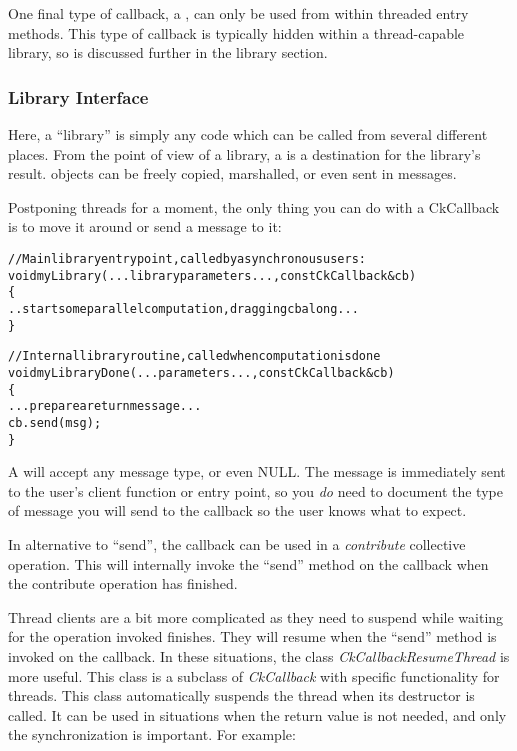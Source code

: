One final type of callback, a , 
can only be used from within threaded entry methods.  This type of callback
is typically hidden within a thread-capable library, so is discussed further
in the library section.


\subsubsection{Library Interface}

Here, a ``library'' is simply any code which can be called from several
different places.  From the point of view of a library, a 
is a destination for the library's result.   objects can
be freely copied, marshalled, or even sent in messages.

Postponing threads for a moment, the only thing you can do 
with a CkCallback is to move it around or send a message to it:

\begin{alltt}
//Main library entry point, called by asynchronous users:
void myLibrary(...library parameters...,const CkCallback \&cb) 
\{
  ..start some parallel computation, dragging cb along...
\}

//Internal library routine, called when computation is done
void myLibraryDone(...parameters...,const CkCallback \&cb)
\{
  ...prepare a return message...
  cb.send(msg);
\}
\end{alltt}

A  will accept any message type, or even NULL.  The
message is immediately sent to the user's client function or entry point,
so you {\em do} need to document the type of message you will send to the 
callback so the user knows what to expect.

In alternative to ``send'', the callback can be used in a {\em contribute}
collective operation. This will internally invoke the ``send'' method on the
callback when the contribute operation has finished.

Thread clients are a bit more complicated as they need to suspend while waiting
for the operation invoked finishes. They will resume when the ``send'' method is
invoked on the callback.
In these situations, the class {\em CkCallbackResumeThread} is more useful. This
class is a subclass of {\em CkCallback} with specific functionality for threads.
This class automatically suspends the thread when its destructor is called. It
can be used in situations when the return value is not needed, and only the
synchronization is important. For example:

